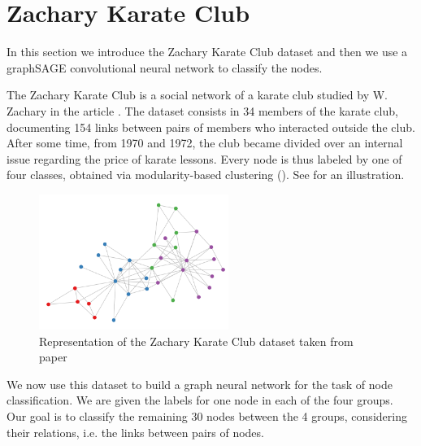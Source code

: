 \documentclass[12pt,a4paper]{report}
\theoremstyle{definition}
\begin{document}
\section{Zachary Karate Club}
\label{sec:Zachary}

In this section we introduce the Zachary Karate Club dataset and then we use a graphSAGE convolutional neural network to classify the nodes.

The Zachary Karate Club is a social network of a karate club studied by W. Zachary in the article \cite{ZacharyKarateClub}.
The dataset consists in 34 members of the karate club, documenting 154 links between pairs of members who interacted outside the club.
After some time, from 1970 and 1972, the club became divided over an internal issue regarding the price of karate lessons.
Every node is thus labeled by one of four classes, obtained via modularity-based clustering (\cite{Modularity_clustering}).
See  for an illustration.

\begin{figure}
    \centering
    \includegraphics[width=0.55\textwidth]{Images/karate_club.png}
    \caption{Representation of the Zachary Karate Club dataset taken from paper \cite{Kipf_welling}}
    \label{fig:karateclub}
\end{figure}

We now use this dataset to build a graph neural network for the task of node classification.
We are given the labels for one node in each of the four groups.
Our goal is to classify the remaining 30 nodes between the 4 groups, considering their relations, i.e. the links between pairs of nodes.
\end{document}
